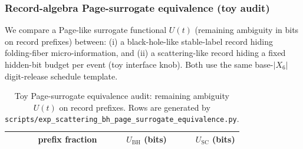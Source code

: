 %

\subsubsection{Record-algebra Page-surrogate equivalence (toy audit)}
\label{subsec:scattering_bh_page_surrogate_equivalence_toy}

\AuditTag We compare a Page-like surrogate functional $U(t)$ (remaining ambiguity in bits on record prefixes) between:
(i) a black-hole-like stable-label record hiding folding-fiber micro-information, and
(ii) a scattering-like record hiding a fixed hidden-bit budget per event (toy interface knob).
Both use the same base-$|X_6|$ digit-release schedule template.

\begin{table}[t]
\centering
\scriptsize
\setlength{\tabcolsep}{6pt}
\renewcommand{\arraystretch}{1.15}
\begin{tabular}{r r r}
\toprule
prefix fraction & $U_{\mathrm{BH}}$ (bits) & $U_{\mathrm{SC}}$ (bits) \\
\midrule

\end{tabular}
\caption{Toy Page-surrogate equivalence audit: remaining ambiguity $U(t)$ on record prefixes. Rows are generated by \texttt{scripts/exp\_scattering\_bh\_page\_surrogate\_equivalence.py}.}
\label{tab:scattering_bh_page_surrogate_equivalence_toy}
\end{table}

%

